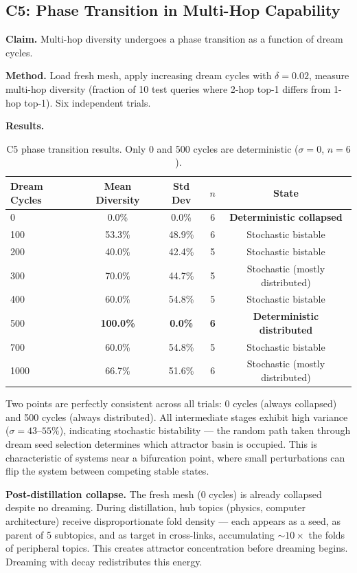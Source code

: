 \documentclass[11pt]{article}
\begin{document}
\subsection{C5: Phase Transition in Multi-Hop Capability}

\textbf{Claim.} Multi-hop diversity undergoes a phase transition as a function
of dream cycles.

\textbf{Method.} Load fresh mesh, apply increasing dream cycles with
$\delta=0.02$, measure multi-hop diversity (fraction of 10 test queries where
2-hop top-1 differs from 1-hop top-1). Six independent trials.

\textbf{Results.}

\begin{table}[h]
\centering
\begin{tabular}{lcccc}
\toprule
Dream Cycles & Mean Diversity & Std Dev & $n$ & State \\
\midrule
0   & 0.0\%  & 0.0\%  & 6 & \textbf{Deterministic collapsed} \\
100 & 53.3\% & 48.9\% & 6 & Stochastic bistable \\
200 & 40.0\% & 42.4\% & 5 & Stochastic bistable \\
300 & 70.0\% & 44.7\% & 5 & Stochastic (mostly distributed) \\
400 & 60.0\% & 54.8\% & 5 & Stochastic bistable \\
500 & \textbf{100.0\%} & \textbf{0.0\%} & \textbf{6} & \textbf{Deterministic distributed} \\
700 & 60.0\% & 54.8\% & 5 & Stochastic bistable \\
1000 & 66.7\% & 51.6\% & 6 & Stochastic (mostly distributed) \\
\bottomrule
\end{tabular}
\caption{C5 phase transition results. Only 0 and 500 cycles are deterministic ($\sigma=0$, $n=6$).}
\end{table}

Two points are perfectly consistent across all trials: 0 cycles (always
collapsed) and 500 cycles (always distributed). All intermediate stages exhibit
high variance ($\sigma = 43$--$55\%$), indicating stochastic bistability --- the
random path taken through dream seed selection determines which attractor basin
is occupied. This is characteristic of systems near a bifurcation point, where
small perturbations can flip the system between competing stable states.

\textbf{Post-distillation collapse.} The fresh mesh (0 cycles) is already
collapsed despite no dreaming. During distillation, hub topics (physics,
computer architecture) receive disproportionate fold density --- each appears as
a seed, as parent of 5 subtopics, and as target in cross-links, accumulating
$\sim10\times$ the folds of peripheral topics. This creates attractor
concentration before dreaming begins. Dreaming with decay redistributes this
energy.
\end{document}
